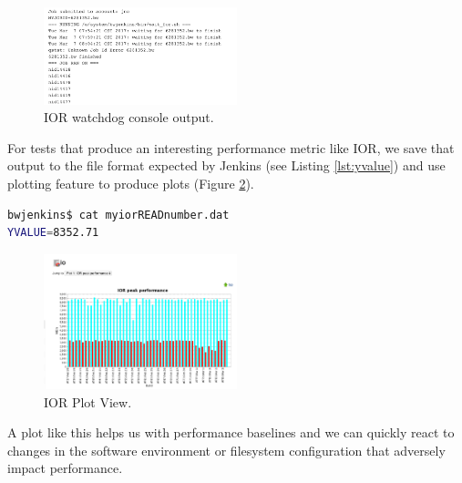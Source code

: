 \documentclass[10pt, conference, compsocconf]{IEEEtran}
\begin{document}
\begin{figure}[H]
\centering
\includegraphics[width=0.5\textwidth]{IOR-watchdog-out}
\caption{ IOR watchdog console output.}
\label{fig:IOR-watchdog-out}
\end{figure}
For tests that produce an interesting performance metric like IOR, we save that output to the file format expected by Jenkins (see Listing \ref{lst:yvalue}) and use plotting feature to produce plots (Figure \ref{fig:IOR-plot}). 
\begin{lstlisting}[frame=tb,captionpos=t,language=bash,caption={sample YVALUE output file}, label=lst:yvalue]
bwjenkins$ cat myiorREADnumber.dat 
YVALUE=8352.71
\end{lstlisting}
\begin{figure}[H]
\centering
\includegraphics[width=0.5\textwidth]{IOR-plot}
\caption{IOR Plot View.}
\label{fig:IOR-plot}
\end{figure}
A plot like this helps us with performance baselines and we can quickly react to changes in the software environment or filesystem configuration that adversely impact performance.
\end{document}
